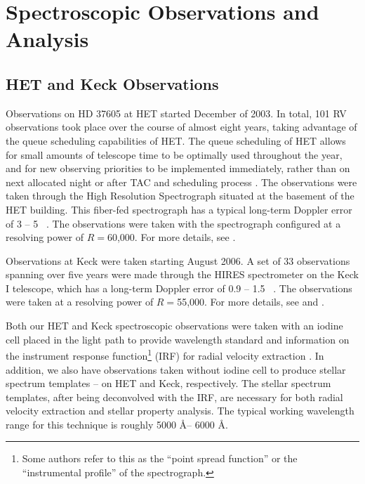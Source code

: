 \section{Spectroscopic Observations and Analysis}\label{sec:spec}
\subsection{HET and Keck Observations}
Observations on HD 37605 at HET started December of 2003. In total,
101 RV observations took place over the course of almost eight years,
taking advantage of the queue scheduling capabilities of HET.
The queue scheduling of HET allows for small amounts of telescope time
to be optimally used throughout the year, and for new observing
priorities to be implemented immediately, rather than on next
allocated night or after TAC and scheduling process \citep{hetque2007}.
The observations were taken through the High Resolution Spectrograph
\cite[HRS;][]{1998SPIE.3355..387T} situated at the basement of the HET
building. This
fiber-fed spectrograph has a typical long-term Doppler error of 3 -- 5
\mps\ \citep{2009MNRAS.393..969B}. The observations were taken with the
spectrograph configured at a resolving power of $R=$60,000. For more
details, see \cite{cochran2004}.

Observations at Keck were taken starting August 2006. A set of 33
observations spanning over five years were made through the HIRES
spectrometer \citep{1994SPIE.2198..362V} on the Keck I telescope,
which has a long-term Doppler error of 0.9 -- 1.5 \mps\
\citep[e.g.][]{2009ApJ...696...75H}. The observations were taken at a
resolving power of $R=$55,000. For more details, see
\cite{2009ApJ...696...75H} and \cite{2009ApJ...702..989V}.

Both our HET and Keck spectroscopic observations were taken with an
iodine cell placed in the light path to provide wavelength standard
and information on the instrument response function\footnote{Some
  authors refer to this as the ``point spread function'' or the
  ``instrumental profile'' of the spectrograph.}  (IRF) for radial
velocity extraction \citep{1992PASP..104..270M, 1996PASP..108..500B}.
In addition, we also have observations taken without iodine cell to
produce stellar spectrum templates -- on HET and Keck,
respectively. The stellar spectrum templates, after being deconvolved
with the IRF, are necessary for both radial velocity extraction and
stellar property analysis. The typical working wavelength range for
this technique is roughly 5000 \AA -- 6000 \AA.


